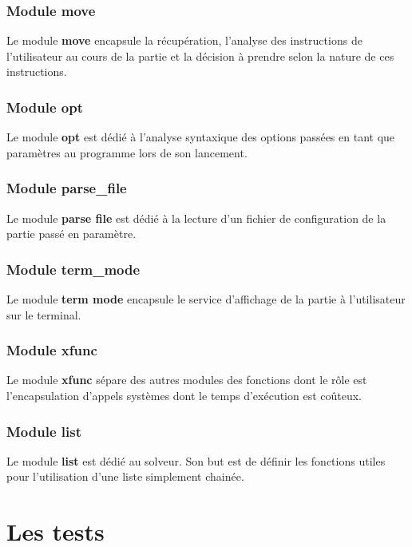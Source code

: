 \documentclass{report}
\begin{document}
\subsection*{Module move}
Le module \textbf{move} encapsule la récupération, l'analyse des instructions de l'utilisateur au cours de la partie et la décision à prendre selon la nature de ces instructions.
\subsection*{Module opt}
Le module \textbf{opt} est dédié à l'analyse syntaxique des options passées en tant que paramètres au programme lors de son lancement.
\subsection*{Module parse\_file}
Le module \textbf{parse file} est dédié à la lecture d'un fichier de configuration de la partie passé en paramètre.
\subsection*{Module term\_mode}
Le module \textbf{term mode} encapsule le service d'affichage de la partie à l'utilisateur sur le terminal.
\subsection*{Module xfunc}
Le module \textbf{xfunc} sépare des autres modules des fonctions dont le rôle est l'encapsulation d'appels systèmes dont le temps d'exécution est coûteux.
\subsection*{Module list}
Le module \textbf{list} est dédié au solveur. Son but est de définir les fonctions utiles pour l'utilisation d'une liste simplement chainée.


\chapter{Les tests}
\setcounter{section}{0}
\end{document}
